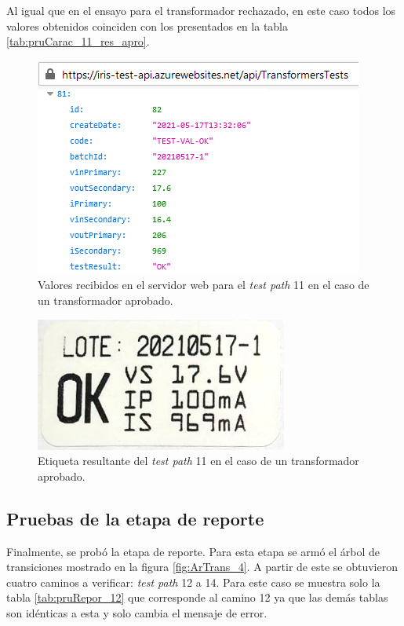 Al igual que en el ensayo para el transformador rechazado, en este caso todos los valores obtenidos coinciden con los presentados en la tabla \ref{tab:pruCarac_11_res_apro}.

\begin{figure}[htpb]
	\centering
	\includegraphics[scale=0.9]{./Figures/serv_web_ok_resul.png}
	\caption{Valores recibidos en el servidor web para el \textit{test path} 11 en el caso de un transformador aprobado.}
	\label{fig:serv_web_ok_resul}
\end{figure}

\begin{figure}[htpb]
	\centering
	\includegraphics[scale=0.7]{./Figures/etiqueta_OK.png}
	\caption{Etiqueta resultante del \textit{test path} 11 en el caso de un transformador aprobado.}
	\label{fig:etiqueta_OK}
\end{figure}

\pagebreak

\subsection{Pruebas de la etapa de reporte}

Finalmente, se probó la etapa de reporte. Para esta etapa se armó el árbol de transiciones mostrado en la figura \ref{fig:ArTrans_4}. A partir de este se obtuvieron cuatro caminos a verificar: \textit{test path} 12 a 14. Para este caso se muestra solo la tabla \ref{tab:pruRepor_12} que corresponde al camino 12 ya que las demás tablas son idénticas a esta y solo cambia el mensaje de error.

